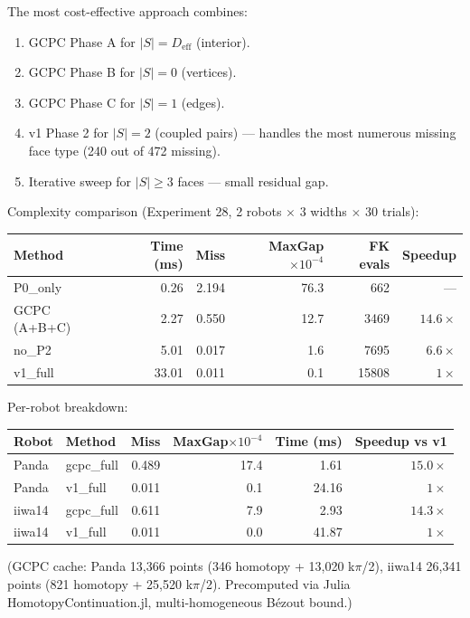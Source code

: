 \documentclass[11pt,a4paper]{article}
\begin{document}
The most cost-effective approach combines:
\begin{enumerate}
  \item GCPC Phase A for $|S| = D_\text{eff}$ (interior).
  \item GCPC Phase B for $|S| = 0$ (vertices).
  \item GCPC Phase C for $|S| = 1$ (edges).
  \item v1 Phase 2 for $|S| = 2$ (coupled pairs) — handles the most
        numerous missing face type (240 out of 472 missing).
  \item Iterative sweep for $|S| \ge 3$ faces — small residual gap.
\end{enumerate}

Complexity comparison (Experiment 28, 2 robots $\times$ 3 widths $\times$ 30 trials):
\begin{center}
\begin{tabular}{l|rrrrr}
\toprule
Method & Time (ms) & Miss & MaxGap$\times 10^{-4}$ & FK evals & Speedup \\
\midrule
P0\_only     & 0.26  & 2.194 & 76.3  &  662  & --- \\
GCPC (A+B+C) & 2.27  & 0.550 & 12.7  & 3469  & $\mathbf{14.6\times}$ \\
no\_P2       & 5.01  & 0.017 &  1.6  & 7695  & $6.6\times$ \\
v1\_full     & 33.01 & 0.011 &  0.1  & 15808 & $1\times$ \\
\bottomrule
\end{tabular}
\end{center}

Per-robot breakdown:
\begin{center}
\begin{tabular}{ll|rrrr}
\toprule
Robot & Method & Miss & MaxGap$\times 10^{-4}$ & Time (ms) & Speedup vs v1 \\
\midrule
Panda  & gcpc\_full & 0.489 & 17.4 & 1.61 & $15.0\times$ \\
Panda  & v1\_full   & 0.011 &  0.1 & 24.16 & $1\times$ \\
iiwa14 & gcpc\_full & 0.611 &  7.9 & 2.93 & $14.3\times$ \\
iiwa14 & v1\_full   & 0.011 &  0.0 & 41.87 & $1\times$ \\
\bottomrule
\end{tabular}
\end{center}
(GCPC cache: Panda 13{,}366 points (346 homotopy + 13{,}020 k$\pi$/2),
iiwa14 26{,}341 points (821 homotopy + 25{,}520 k$\pi$/2).
Precomputed via Julia HomotopyContinuation.jl, multi-homogeneous B\'ezout bound.)
\end{document}
